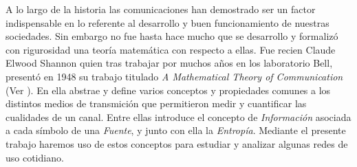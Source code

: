 A lo largo de la historia las comunicaciones han demostrado ser un factor
indispensable en lo referente al desarrollo y buen funcionamiento de nuestras
sociedades. Sin embargo no fue hasta hace mucho que se desarrollo y formalizó
con rigurosidad una teoría matemática con respecto a ellas. Fue recien Claude
Elwood Shannon quien tras trabajar por muchos años en los laboratorio Bell,
presentó en 1948 su trabajo titulado \textit{A Mathematical Theory of
Communication} (Ver \cite{shannon}). En ella abstrae y define varios conceptos y propiedades comunes
a los distintos medios de transmición que permitieron medir y cuantificar las
cualidades de un canal. Entre ellas introduce el concepto de
\textit{Información} asociada a cada símbolo de una \textit{Fuente}, y junto
con ella la \textit{Entropía}. Mediante el presente trabajo haremos uso de
estos conceptos para estudiar y analizar algunas redes de uso cotidiano.






